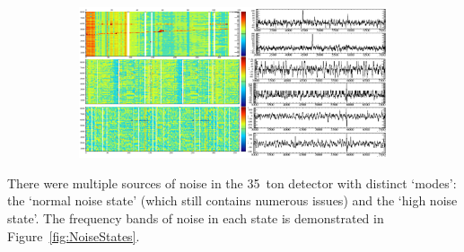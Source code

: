 \begin{figure}
  \centering

  \begin{subfigure}[t]{\linewidth}
    \centering
    \includegraphics[width=\textwidth]{DataMuonCombined.png}
    \caption{}
    \label{fig:DataMuon}
  \end{subfigure}

  \begin{subfigure}[t]{\linewidth}
    \centering
    \caption{}
    \label{fig:SimulationMuon}
  \end{subfigure}

  \caption{}
  \label{fig:DataSimulationNoiseComparison}

\end{figure}

There were multiple sources of noise in the 35~ton detector with distinct `modes': the `normal noise state' (which still contains numerous issues) and the `high noise state'.  The frequency bands of noise in each state is demonstrated in Figure~\ref{fig:NoiseStates}.

